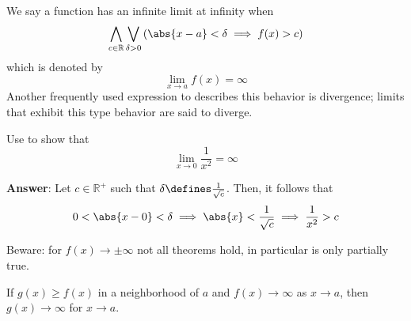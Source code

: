 \begin{definition}\label{def-infinite-limits}
    We say a function has an infinite limit at infinity when
    \begin{equation}
        \bigwedge_{c\in\mathbb{R}}\bigvee_{\delta>0}
        \left(\abs{x-a}<\delta \implies f(x)>c\right)
    \end{equation}
    which is denoted by
    \begin{equation}
        \lim_{x \to a}f(x)=\infty
    \end{equation}
    Another frequently used expression to describes this behavior is divergence;
    limits that exhibit this type behavior are said to diverge. 
\end{definition}

\begin{exm}\label{exm-infinity-limit:3}
    Use  to show that
    \begin{equation}
        \lim_{x \to 0}\frac{1}{x^2}=\infty
    \end{equation}
    \begin{flushleft}
        \textbf{Answer}: Let $c\in\mathbb{R}^+$ such that $\delta\defines\tfrac{1}{\sqrt{c}}$.
        Then, it follows that
        \begin{equation*}
            0<\abs{x-0}<\delta \implies \abs{x} < \frac{1}{\sqrt{c}} \implies \frac{1}{x^2} > c
        \end{equation*}
    \end{flushleft}
\end{exm}

\begin{rem}
    Beware: for $f(x) \to \pm\infty$ not all theorems hold, in particular 
     is only partially true.
\end{rem}

\begin{thm}\label{thm-pizza-theorem}
    If $g(x) \geq f(x)$ in a neighborhood of $a$ and $f(x) \to \infty$ as $x \to a$,
    then $g(x) \to \infty$ for $x \to a$.
\end{thm}
